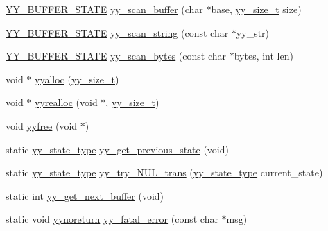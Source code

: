 \begin{DoxyCompactItemize}
\item 
\hyperlink{_genesys_09_09-scanner_8cpp_a4e5bd2d129903df83f3d13effaf8f3e4}{Y\-Y\-\_\-\-B\-U\-F\-F\-E\-R\-\_\-\-S\-T\-A\-T\-E} \hyperlink{_genesys_09_09-scanner_8cpp_af81595b30c0da73f9034ffb511db6388}{yy\-\_\-scan\-\_\-buffer} (char $\ast$base, \hyperlink{_genesys_09_09-scanner_8cpp_ad557845057f187eec4be07e2717d2afa}{yy\-\_\-size\-\_\-t} size)
\item 
\hyperlink{_genesys_09_09-scanner_8cpp_a4e5bd2d129903df83f3d13effaf8f3e4}{Y\-Y\-\_\-\-B\-U\-F\-F\-E\-R\-\_\-\-S\-T\-A\-T\-E} \hyperlink{_genesys_09_09-scanner_8cpp_aaba3a8c0a4caad352ee68b5742c4a9d1}{yy\-\_\-scan\-\_\-string} (const char $\ast$yy\-\_\-str)
\item 
\hyperlink{_genesys_09_09-scanner_8cpp_a4e5bd2d129903df83f3d13effaf8f3e4}{Y\-Y\-\_\-\-B\-U\-F\-F\-E\-R\-\_\-\-S\-T\-A\-T\-E} \hyperlink{_genesys_09_09-scanner_8cpp_acbf193b612e891a3fca6a810daa18c66}{yy\-\_\-scan\-\_\-bytes} (const char $\ast$bytes, int len)
\item 
void $\ast$ \hyperlink{_genesys_09_09-scanner_8cpp_a7da304d8ef6c688c0835d35296fe61c2}{yyalloc} (\hyperlink{_genesys_09_09-scanner_8cpp_ad557845057f187eec4be07e2717d2afa}{yy\-\_\-size\-\_\-t})
\item 
void $\ast$ \hyperlink{_genesys_09_09-scanner_8cpp_abcb4148bc13fe254059384c2fdf472b7}{yyrealloc} (void $\ast$, \hyperlink{_genesys_09_09-scanner_8cpp_ad557845057f187eec4be07e2717d2afa}{yy\-\_\-size\-\_\-t})
\item 
void \hyperlink{_genesys_09_09-scanner_8cpp_a70f82d43d4797bb2a50f7678ddbfbda5}{yyfree} (void $\ast$)
\item 
static \hyperlink{_genesys_09_09-scanner_8cpp_a9ba7c416f135b0f0c1f4addded4616b5}{yy\-\_\-state\-\_\-type} \hyperlink{_genesys_09_09-scanner_8cpp_ad7a179bfb29968916da20ca16f6ab370}{yy\-\_\-get\-\_\-previous\-\_\-state} (void)
\item 
static \hyperlink{_genesys_09_09-scanner_8cpp_a9ba7c416f135b0f0c1f4addded4616b5}{yy\-\_\-state\-\_\-type} \hyperlink{_genesys_09_09-scanner_8cpp_a45a1e65d8dcd5cb30c5d315c91800a5f}{yy\-\_\-try\-\_\-\-N\-U\-L\-\_\-trans} (\hyperlink{_genesys_09_09-scanner_8cpp_a9ba7c416f135b0f0c1f4addded4616b5}{yy\-\_\-state\-\_\-type} current\-\_\-state)
\item 
static int \hyperlink{_genesys_09_09-scanner_8cpp_a3b3b5f60f720da3f621223997266498c}{yy\-\_\-get\-\_\-next\-\_\-buffer} (void)
\item 
static void \hyperlink{_genesys_09_09-scanner_8cpp_a452d0647f1848fea42589793f3e2d1f4}{yynoreturn} \hyperlink{_genesys_09_09-scanner_8cpp_a25d1992696acab2c6c3b6a6b45d2f487}{yy\-\_\-fatal\-\_\-error} (const char $\ast$msg)

\end{DoxyCompactItemize}
